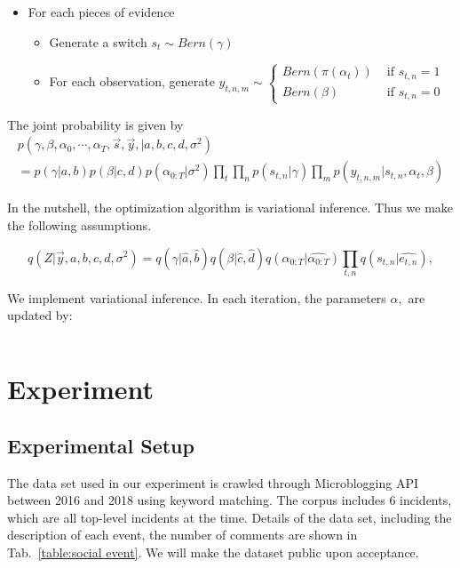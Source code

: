 \documentclass[runningheads]{llncs}
\begin{document}
\begin{itemize}
\item For each pieces of evidence
\begin{itemize}
\item Generate a switch $s_t \sim Bern(\gamma)$
\item For each observation, generate $y_{t,n,m}\sim \begin{cases}
Bern(\pi(\alpha_t)) & \text{ if } s_{t,n}= 1\\ 
Bern(\beta) & \text{ if } s_{t,n}= 0 
\end{cases}$
\end{itemize}
\end{itemize}

The joint probability is given by
\begin{eqnarray*}
    p(\gamma,\beta,\alpha_0,\cdots,\alpha_T, \vec{s},\vec{y}, |a,b,c,d,\sigma^2) \\
    =    p(\gamma|a,b) p(\beta|c,d)  p(\alpha_{0:T}|\sigma^2) \prod_t \prod_ n p(s_{t,n}|\gamma) \prod_m p(y_{t,n,m}|s_{t,n},\alpha_t,\beta) 
    \end{eqnarray*}

In the nutshell, the optimization algorithm is variational inference. Thus we make the following assumptions. 

\begin{equation*}
q(Z|\vec{y},a,b,c,d,\sigma^2) = q(\gamma|\hat{a},\hat{b}) q(\beta|\hat{c},\hat{d}) q(\alpha_{0:T}|\hat{\alpha_{0:T}})\prod_{t,n} q(s_{t,n}|\hat{e_{t,n}}) , 
\end{equation*}

We implement variational inference. In each iteration, the parameters $\alpha,$ are updated by:

\begin{equation}\label{equ:inference}
\end{equation}


\section{Experiment}\label{sec:Experiment}
\subsection{Experimental Setup}
The data set used in our experiment is crawled through Microblogging API between 2016 and 2018 using keyword matching. The corpus includes 6 incidents, which are all top-level incidents at the time. %
Details of the data set, including the description of each event, the number of comments are shown in Tab.~\ref{table:social event}. We will make the dataset public upon acceptance.
\end{document}
